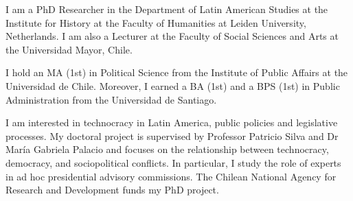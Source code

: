 




\par{I am a PhD Researcher in the Department of Latin American Studies at the Institute for History at the Faculty of Humanities at Leiden University, Netherlands. I am also a Lecturer at the Faculty of Social Sciences and Arts at the Universidad Mayor, Chile.

I hold an MA (1st) in Political Science from the Institute of Public Affairs at the Universidad de Chile. Moreover, I earned a BA (1st) and a BPS (1st) in Public Administration from the Universidad de Santiago.

I am interested in technocracy in Latin America, public policies and legislative processes. My doctoral project is supervised by Professor Patricio Silva and Dr María Gabriela Palacio and focuses on the relationship between technocracy, democracy, and sociopolitical conflicts. In particular, I study the role of experts in ad hoc presidential advisory commissions. The Chilean National Agency for Research and Development funds my PhD project.}\\
